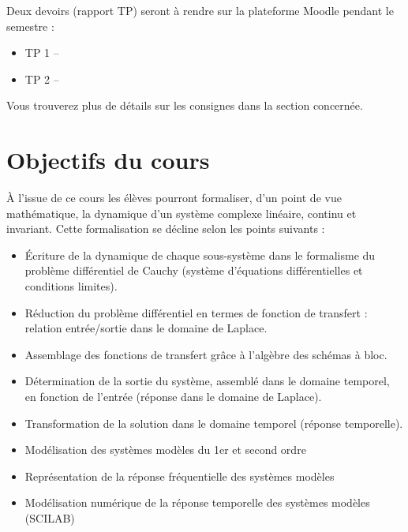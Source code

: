 \documentclass[a4paper,11pt]{article}
\begin{document}
Deux devoirs (rapport TP) seront à rendre sur la plateforme Moodle pendant le semestre :
\begin{itemize}
    \item TP 1 --
    \item TP 2 -- 
\end{itemize}

Vous trouverez plus de détails sur les consignes dans la section concernée. 

\section*{Objectifs du cours}

À  l'issue  de  ce  cours  les  élèves  pourront  formaliser,  d'un  point  de  vue  mathématique,  
la dynamique d'un système complexe linéaire, continu et invariant. Cette formalisation se décline selon 
les points suivants :  

\begin{itemize}
    \item \'Ecriture  de  la  dynamique  de  chaque  sous-système  dans  le  formalisme  du  
          problème différentiel de Cauchy (système d'équations différentielles et conditions limites).
    \item Réduction du problème différentiel en termes de fonction de transfert : relation entrée/sortie 
          dans le domaine de Laplace.
    \item Assemblage des fonctions de transfert grâce à l'algèbre des schémas à bloc. 
    \item Détermination de la sortie du système, assemblé dans le domaine temporel, en fonction 
          de l'entrée (réponse dans le domaine de Laplace).
    \item Transformation de la solution dans le domaine temporel (réponse temporelle).
    \item Modélisation des systèmes modèles du 1er et second ordre 
    \item Représentation de la réponse fréquentielle des systèmes modèles
    \item Modélisation numérique de la réponse temporelle des systèmes modèles (SCILAB)
\end{itemize}
\end{document}

